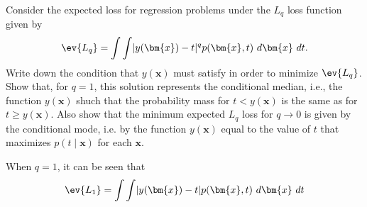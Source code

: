 \begin{question}{1.27}
	Consider the expected loss for regression problems under the $L_q$ loss function given by
	\begin{align*}
		\ev{L_q} = \int\int \lvert y(\bm{x}) - t \rvert^q p(\bm{x}, t)\ d\bm{x}\ dt.
	\end{align*}
	Write down the condition that $y(\bm{x})$ must satisfy in order to minimize $\ev{L_q}$. Show that, for $q = 1$, this solution represents the conditional median, i.e., the function $y(\bm{x})$ shuch that the probability mass for $t < y(\bm{x})$ is the same as for $t \geq y(\bm{x})$. Also show that the minimum expected $L_q$ loss for $q \rightarrow 0$ is given by the conditional mode, i.e. by the function $y(\bm{x})$ equal to the value of $t$ that maximizes $p(t \mid \bm{x})$ for each $\bm{x}$.
\end{question}

\begin{answer}{}
	When $q = 1$, it can be seen that
	\begin{align}
		\ev{L_1} &= \int\int \lvert y(\bm{x}) - t \rvert p(\bm{x}, t)\ d\bm{x}\ dt\\
		
	\end{align}
\end{answer}